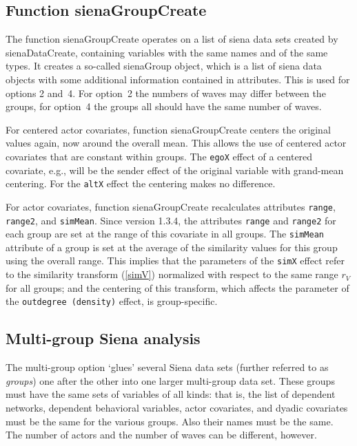 \documentclass[a4paper,fleqn,11pt]{article}
\newcommand{\+}{\, + \,}
\newcommand{\sfn}[1]{\textsf{#1}}
\begin{document}
\subsection{Function \textsf{sienaGroupCreate}  }
\label{S_multigroup}

The function \textsf{sienaGroupCreate} operates on a list
of \sfn{siena} data sets created by \textsf{sienaDataCreate},
containing variables with the same names and of the same types.
It creates a so-called \sfn{sienaGroup} object, which is a list of
\sfn{siena} data objects with some additional information
contained in attributes.
This is used for options 2 and~4.
For option~2 the numbers of waves may differ between the groups,
for option~4 the groups all should have the same number of waves.

For centered actor covariates, function \textsf{sienaGroupCreate}
centers the original values again, now around the overall mean.
This allows the use of centered actor covariates that are
constant within groups.
The \texttt{egoX} effect of a centered covariate,
e.g., will be the sender effect of the original variable
with grand-mean centering. For the \texttt{altX} effect the centering
makes no difference.

For actor covariates, function \textsf{sienaGroupCreate} recalculates
attributes \texttt{range}, \texttt{range2}, and \texttt{simMean}.
Since version 1.3.4,
the attributes \texttt{range} and \texttt{range2} for each group are set
at the range of this covariate in all groups.
The \texttt{simMean} attribute
of a group is set at the average of the similarity values
for this group using the overall range.
This implies that the parameters of the \texttt{simX} effect refer
to the similarity transform (\ref{simV})
normalized with respect to the same range
$r_V$ for all groups; and the centering of this transform,
which affects the parameter of the \texttt{outdegree (density)} effect,
is group-specific.

\subsection{Multi-group Siena analysis}
\label{S_multigroup}

The multi-group option `glues' several Siena data sets
(further referred to as \emph{groups}) one after the other
into one larger multi-group data set.
These groups must have the same sets of variables of all kinds:
that is, the list of dependent networks, dependent behavioral variables,
actor covariates, and dyadic covariates must be the same
for the various groups.
Also their names must be the same.
The number of actors and the number of waves can be different, however.
\end{document}
